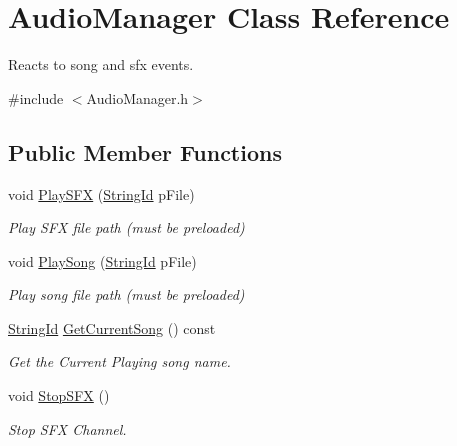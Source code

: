 \hypertarget{classAudioManager}{}\section{Audio\+Manager Class Reference}
\label{classAudioManager}


Reacts to song and sfx events.  




{\ttfamily \#include $<$Audio\+Manager.\+h$>$}

\subsection*{Public Member Functions}
\begin{DoxyCompactItemize}
\item 
void \hyperlink{classAudioManager_a7c46b6078950fdb622672bf10c58e87e}{Play\+S\+FX} (\hyperlink{classStringId}{String\+Id} p\+File)
\begin{DoxyCompactList}\small\item\em Play S\+FX file path (must be preloaded) \end{DoxyCompactList}\item 
void \hyperlink{classAudioManager_a50184981af15f336b986cffb5e6c57d3}{Play\+Song} (\hyperlink{classStringId}{String\+Id} p\+File)
\begin{DoxyCompactList}\small\item\em Play song file path (must be preloaded) \end{DoxyCompactList}\item 
\hyperlink{classStringId}{String\+Id} \hyperlink{classAudioManager_ac1a61ce7acbbb62fa5b8f56870a8f674}{Get\+Current\+Song} () const
\begin{DoxyCompactList}\small\item\em Get the Current Playing song name. \end{DoxyCompactList}\item 
\mbox{\label{classAudioManager_a6f046330684dee2f1e2c0bcffde5a9b2}} 
void \hyperlink{classAudioManager_a6f046330684dee2f1e2c0bcffde5a9b2}{Stop\+S\+FX} ()
\begin{DoxyCompactList}\small\item\em Stop S\+FX Channel. \end{DoxyCompactList}\item 
\mbox{\label{classAudioManager_a51bdb4c55fa5bf1f538c281fe8a16fad}} 

\end{DoxyCompactItemize}
